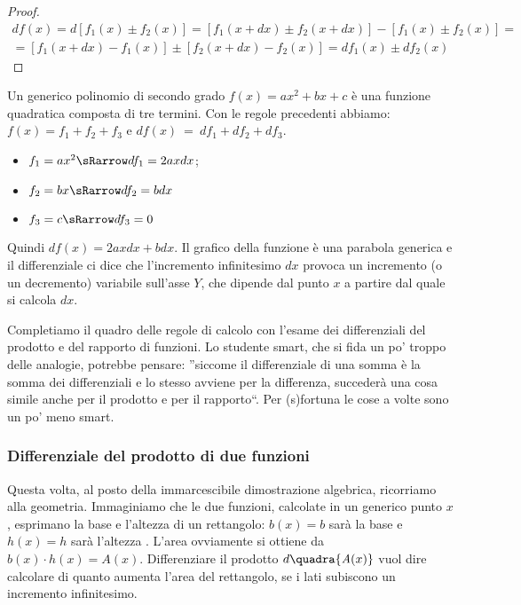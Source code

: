 \begin{proof}
\begin{align*}
 df(x)=d[f_1(x)\pm f_2(x)]=[f_1(x+dx)\pm f_2(x+dx)]-[f_1(x)\pm f_2(x)]=\\
 = [f_1(x+dx)-f_1(x)]\pm [f_2(x+dx)-f_2(x)]= df_1(x)\pm df_2(x)
\end{align*}
\end{proof}

\begin{esempio}
 Un generico polinomio di secondo grado \(f(x)=ax^2+bx+c\) è una
 funzione quadratica composta di tre termini. 
 Con le regole precedenti abbiamo: \(f(x)=f_1+f_2+f_3\) e
 \(df(x)~=~df_1+df_2+df_3\).
 \begin{itemize} [noitemsep]
  \item $f_1=ax^2 \sRarrow df_1=2axdx$; 
  \item $f_2=bx \sRarrow df_2=bdx$
  \item $f_3=c \sRarrow df_3=0$
 \end{itemize}
Quindi $df(x)=2axdx+bdx$. Il grafico della funzione è una parabola generica
e il differenziale ci dice che l'incremento infinitesimo 
$dx$ provoca un incremento (o un decremento) variabile sull'asse $Y$, che 
dipende dal punto $x$ a partire dal quale si calcola $dx$.
\end{esempio}

Completiamo il quadro delle regole di calcolo con l'esame dei differenziali
del prodotto e del rapporto di funzioni. Lo studente smart, che si fida un 
po' 
troppo delle analogie, potrebbe pensare: ''siccome il differenziale di una 
somma è la somma dei differenziali e lo stesso avviene per la differenza, 
succederà una cosa simile anche per il prodotto e per il rapporto``. 
Per (s)fortuna le cose a volte sono un po' meno smart.

\subsubsection{Differenziale del prodotto di due funzioni}
\label{}
Questa volta, al posto della immarcescibile dimostrazione algebrica, 
ricorriamo
alla geometria. Immaginiamo che le due funzioni, calcolate in un generico 
punto $x$,
esprimano la base e l'altezza di un rettangolo:
$b(x)=b$ sarà la base  e $h(x)=h$ sarà l'altezza . L'area ovviamente
si ottiene da $b(x)\cdot h(x)=\mathit{A}(x)$. 
Differenziare il prodotto $d\quadra{\mathit{A}(x)}$ vuol dire calcolare di
quanto aumenta l'area del rettangolo, se i lati subiscono un incremento 
infinitesimo. 

